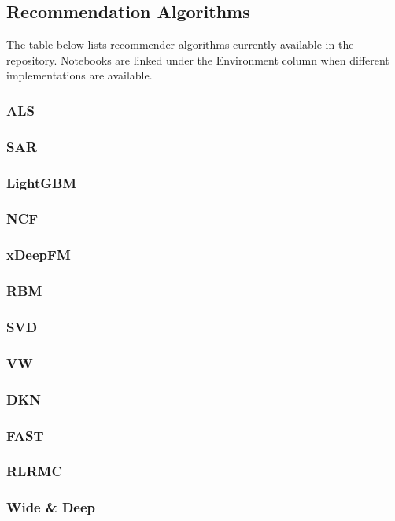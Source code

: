 \subsection{Recommendation Algorithms}

The table below lists recommender algorithms currently available in the repository. Notebooks are linked under the Environment column when different implementations are available.


\subsubsection{ALS}


\subsubsection{SAR}

\subsubsection{LightGBM}

\subsubsection{NCF}

\subsubsection{xDeepFM}

\subsubsection{RBM}

\subsubsection{SVD}

\subsubsection{VW}

\subsubsection{DKN}

\subsubsection{FAST}

\subsubsection{RLRMC}

\subsubsection{Wide \& Deep}
